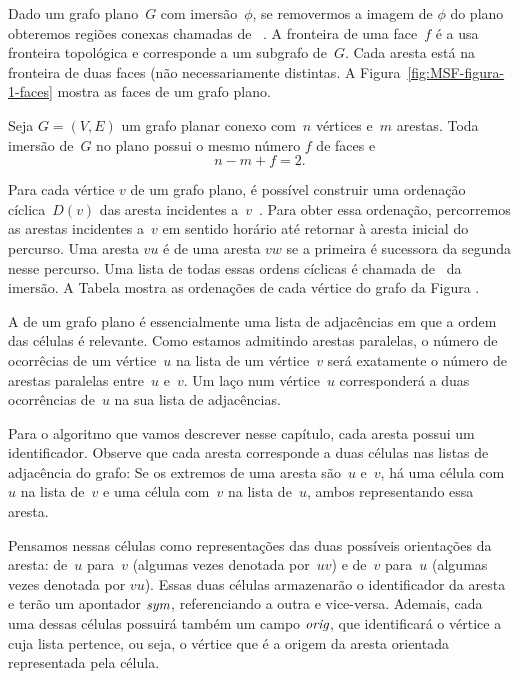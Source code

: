 Dado um grafo plano~$G$ com imersão~$\phi$, se removermos a imagem de $\phi$ do plano obteremos regiões conexas chamadas de ~\cite{planarTheoryAlgorith}.
A fronteira de uma face~$f$ é a usa fronteira topológica e corresponde a um subgrafo de~$G$.
Cada aresta está na fronteira de duas faces (não necessariamente distintas.
A Figura~\ref{fig:MSF-figura-1-faces} mostra as faces de um grafo plano.


\begin{theorem}
\label{teo:MSFEuler}
Seja $G=(V,E)$ um grafo planar conexo com~$n$ vértices e~$m$ arestas. Toda imersão de~$G$ no plano possui o mesmo número $f$ de faces e
$$
n-m+f = 2.
$$
\end{theorem}

Para cada vértice $v$ de um grafo plano, é possível construir uma ordenação cíclica~$D(v)$ das aresta incidentes a~$v$~\cite{noma2003}.
Para obter essa ordenação, percorremos as arestas incidentes a~$v$ em sentido horário até retornar à aresta inicial do percurso.
Uma aresta $vu$ é  de uma aresta $vw$ se a primeira é sucessora da segunda nesse percurso.
Uma lista de todas essas ordens cíclicas é chamada de~ da imersão.
A Tabela  mostra as ordenações de cada vértice do grafo da Figura .

A  de um grafo plano é essencialmente uma lista de adjacências em que a ordem das células é relevante.
Como estamos admitindo arestas paralelas, o número de ocorrêcias de um vértice~$u$ na lista de um vértice~$v$ será exatamente o número de arestas paralelas entre~$u$ e~$v$.
Um laço num vértice~$u$ corresponderá a duas ocorrências de~$u$ na sua lista de adjacências.

Para o algoritmo que vamos descrever nesse capítulo, cada aresta possui um identificador.
Observe que cada aresta corresponde a duas células nas listas de adjacência do grafo:
Se os extremos de uma aresta são~$u$ e~$v$, há uma célula com~$u$ na lista de~$v$ e uma célula com~$v$ na lista de~$u$, ambos representando essa aresta.

Pensamos nessas células como representações das duas possíveis orientações da aresta: de~$u$ para~$v$ (algumas vezes denotada por~$uv$) e de~$v$ para~$u$ (algumas vezes denotada por $vu$).
Essas duas células armazenarão o identificador da aresta e terão um apontador $\textit{sym}$, referenciando a outra e vice-versa.
Ademais, cada uma dessas células possuirá também um campo $\textit{orig}$, que identificará o vértice a cuja lista pertence, ou seja, o vértice que é a origem da aresta orientada representada pela célula.

